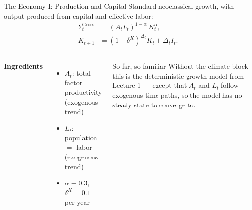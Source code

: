 \documentclass[aspectratio=169,11pt]{beamer}
\newcommand{\emphc}[1]{\textcolor{harvardcrimson}{#1}}
\begin{document}
\begin{frame}{The Economy I: Production and Capital}
Standard neoclassical growth, with output produced from capital and effective labor:
\begin{align*}
    Y^{\text{Gross}}_t &= (A_t L_t)^{1-\alpha}\, K_t^{\alpha}, \\
    K_{t+1} &= (1-\delta^K)^{\Delta_t} K_t + \Delta_t I_t .
\end{align*}

\vspace{0.2cm}
\begin{columns}[T]
\textbf{Ingredients}
\begin{itemize}
    \item $A_t$: total factor productivity (exogenous trend)
    \item $L_t$: population $=$ labor (exogenous trend)
    \item $\alpha = 0.3$, $\delta^K = 0.1$ per year
\end{itemize}

\begin{block}{So far, so familiar}
Without the climate block this is the deterministic growth model from Lecture 1 --- \emphc{except} that $A_t$ and $L_t$ follow exogenous time paths, so the model has no steady state to converge to.
\end{block}
\end{columns}
\end{frame}
\end{document}
